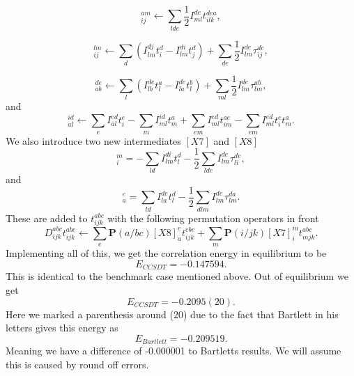\begin{equation}
[X2]_{ij}^{am} \leftarrow 
\sum_{lde}
\frac{1}{2}
I_{ml}^{de} t_{ilk}^{dea},
\end{equation}

\begin{equation}
[X3]_{ij}^{lm} \leftarrow
\sum_d \left( I_{lm}^{dj} t_i^d
- I_{lm}^{di} t_j^d \right)
+ \sum_{de} \frac{1}{2} I_{lm}^{de} \tau_{ij}^{de},
\end{equation}

\begin{equation}
[X4]_{ab}^{de} \leftarrow
\sum_l \left( 
I_{lb}^{de} t_l^a
- I_{la}^{de} t_l^b \right)
+ \sum_{ml} \frac{1}{2} I_{lm}^{de} \tau_{lm}^{ab},
\end{equation}
and 
\begin{equation}
[X6]_{al}^{id} \leftarrow 
\sum_{e} I_{al}^{ed} t_i^e
- \sum_m I_{ml}^{id} t_m^a
+ \sum_{em} I_{ml}^{ed} t_{im}^{ae}
- \sum_{em} I_{ml}^{ed} t_i^e t_m^a.
\end{equation}
We also introduce two new intermediates $[X7]$ and $[X8]$
\begin{equation}
[X7]_i^m = - \sum_{ld} I_{lm}^{di} t_l^d
- \frac{1}{2} \sum_{lde} I_{lm}^{de} \tau_{li}^{de},
\end{equation}
and
\begin{equation}
[X8]_a^e = \sum_{ld} I_{la}^{de} t_l^d
- \frac{1}{2} \sum_{dlm} I_{lm}^{de} \tau_{lm}^{da} .
\end{equation}
These are added to $t_{ijk}^{abc}$ with the following permutation operators in front
\begin{equation}
D_{ijk}^{abc} t_{ijk}^{abc} \leftarrow \sum_e \textbf{P}(a/bc) [X8]_a^e t_{ijk}^{ebc}
+ \sum_m \textbf{P}(i/jk) [X7]_i^m  
t_{mjk}^{abc} .
\end{equation}
Implementing all of this, we get the correlation energy  in equilibrium
to be
\begin{equation}
E_{CCSDT} = -0.147594 .
\end{equation}
This is identical to the benchmark case mentioned above. Out of equilibrium we get
\begin{equation}
E_{CCSDT} = -0.2095(20) .
\end{equation}
Here we marked a parenthesis around (20) due to the fact that Bartlett in his letters gives this energy as
\begin{equation}
E_{Bartlett} = -0.209519 .
\end{equation}
Meaning we have a difference of -0.000001 to Bartletts results. We will assume this is caused by round off errors.  

